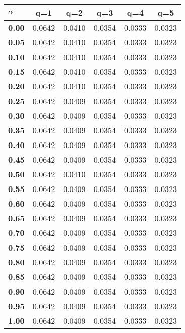 \begin{tabular}{ | l || c | c | c | c | c |}
\hline
\textbf{$\alpha$} & \textbf{}q=1} & \textbf{}q=2} & \textbf{}q=3} & \textbf{}q=4} & \textbf{}q=5} \\
\hline
\textbf{0.00} & 0.0642 & 0.0410 & 0.0354 & 0.0333 & 0.0323\\
\hline
\textbf{0.05} & 0.0642 & 0.0410 & 0.0354 & 0.0333 & 0.0323\\
\hline
\textbf{0.10} & 0.0642 & 0.0410 & 0.0354 & 0.0333 & 0.0323\\
\hline
\textbf{0.15} & 0.0642 & 0.0410 & 0.0354 & 0.0333 & 0.0323\\
\hline
\textbf{0.20} & 0.0642 & 0.0410 & 0.0354 & 0.0333 & 0.0323\\
\hline
\textbf{0.25} & 0.0642 & 0.0409 & 0.0354 & 0.0333 & 0.0323\\
\hline
\textbf{0.30} & 0.0642 & 0.0409 & 0.0354 & 0.0333 & 0.0323\\
\hline
\textbf{0.35} & 0.0642 & 0.0409 & 0.0354 & 0.0333 & 0.0323\\
\hline
\textbf{0.40} & 0.0642 & 0.0409 & 0.0354 & 0.0333 & 0.0323\\
\hline
\textbf{0.45} & 0.0642 & 0.0409 & 0.0354 & 0.0333 & 0.0323\\
\hline
\textbf{0.50} & \underline{0.0642} & 0.0410 & 0.0354 & 0.0333 & 0.0323\\
\hline
\textbf{0.55} & 0.0642 & 0.0409 & 0.0354 & 0.0333 & 0.0323\\
\hline
\textbf{0.60} & 0.0642 & 0.0409 & 0.0354 & 0.0333 & 0.0323\\
\hline
\textbf{0.65} & 0.0642 & 0.0409 & 0.0354 & 0.0333 & 0.0323\\
\hline
\textbf{0.70} & 0.0642 & 0.0409 & 0.0354 & 0.0333 & 0.0323\\
\hline
\textbf{0.75} & 0.0642 & 0.0409 & 0.0354 & 0.0333 & 0.0323\\
\hline
\textbf{0.80} & 0.0642 & 0.0409 & 0.0354 & 0.0333 & 0.0323\\
\hline
\textbf{0.85} & 0.0642 & 0.0409 & 0.0354 & 0.0333 & 0.0323\\
\hline
\textbf{0.90} & 0.0642 & 0.0409 & 0.0354 & 0.0333 & 0.0323\\
\hline
\textbf{0.95} & 0.0642 & 0.0409 & 0.0354 & 0.0333 & 0.0323\\
\hline
\textbf{1.00} & 0.0642 & 0.0409 & 0.0354 & 0.0333 & 0.0323\\
\hline
\end{tabular}
